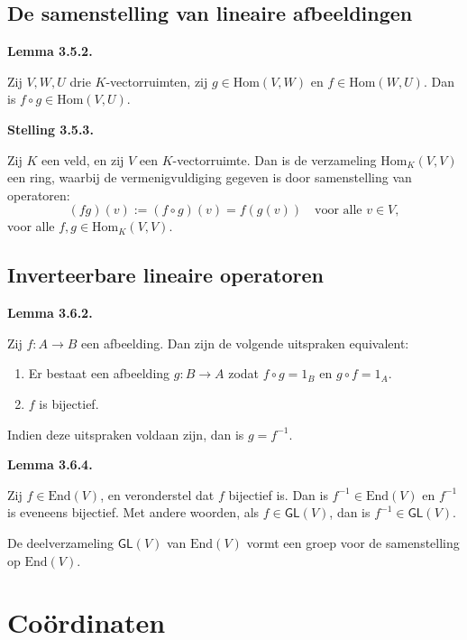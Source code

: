 \documentclass[10pt,a4paper]{article}
\newenvironment{res}[2]{%
  \par\noindent\textbf{#1 #2.}%
}{%
  \par\vspace{2pt}\normalfont
}
\begin{document}
\subsection{De samenstelling van lineaire afbeeldingen}
\begin{res}{Lemma}{3.5.2}
Zij $V,W,U$ drie $K$-vectorruimten, zij $g\in\mathrm{Hom}(V,W)$ en $f\in\mathrm{Hom}(W,U)$. Dan is $f\circ g\in\mathrm{Hom}(V,U)$.
\end{res}

\begin{res}{Stelling}{3.5.3}
Zij $K$ een veld, en zij $V$ een $K$-vectorruimte. Dan is de verzameling $\mathrm{Hom}_K(V,V)$ een ring, waarbij de vermenigvuldiging gegeven is door samenstelling van operatoren:
\[
(fg)(v):=(f\circ g)(v)=f(g(v))\quad\text{voor alle } v\in V,
\]
voor alle $f,g\in\mathrm{Hom}_K(V,V)$.
\end{res}

\subsection{Inverteerbare lineaire operatoren}
\begin{res}{Lemma}{3.6.2}
Zij $f:A\to B$ een afbeelding. Dan zijn de volgende uitspraken equivalent:
\begin{enumerate}[label=(\alph*),leftmargin=1.8em,itemsep=1pt,topsep=1pt]
\item Er bestaat een afbeelding $g:B\to A$ zodat $f\circ g=1_B$ en $g\circ f=1_A$.
\item $f$ is bijectief.
\end{enumerate}
Indien deze uitspraken voldaan zijn, dan is $g=f^{-1}$.
\end{res}

\begin{res}{Lemma}{3.6.4}
\begin{myenum}
\item Zij $f\in\mathrm{End}(V)$, en veronderstel dat $f$ bijectief is. Dan is $f^{-1}\in\mathrm{End}(V)$ en $f^{-1}$ is eveneens bijectief. Met andere woorden, als $f\in \mathsf{GL}(V)$, dan is $f^{-1}\in \mathsf{GL}(V)$.
\item De deelverzameling $\mathsf{GL}(V)$ van $\mathrm{End}(V)$ vormt een groep voor de samenstelling op $\mathrm{End}(V)$.
\end{myenum}
\end{res}

\section{Co\"ordinaten}
\end{document}
